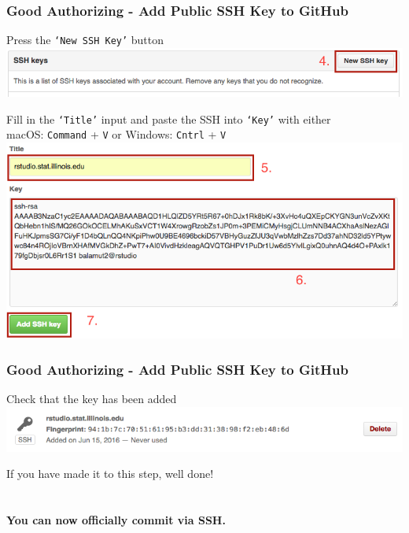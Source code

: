 \documentclass{beamer}\usepackage[]{graphicx}\usepackage[]{color}
\begin{document}
\begin{frame}[fragile]
\frametitle{Good Authorizing - Add Public SSH Key to GitHub}

\begin{block}{Press the \texttt{`New SSH Key'} button}
\centering
\includegraphics[scale=0.35]{img/ssh/github_new_ssh_key.png}
\end{block}

\begin{block}{Fill in the \texttt{`Title'} input and paste the SSH into \texttt{`Key'} with either \\ macOS: \texttt{Command} + \texttt{V} or Windows: \texttt{Cntrl} + \texttt{V}}
\centering
\includegraphics[scale=0.32]{img/ssh/github_ssh_key_add_example.png}
\end{block}

\end{frame}

\begin{frame}[fragile]
\frametitle{Good Authorizing - Add Public SSH Key to GitHub}

\begin{block}{Check that the key has been added}
\centering
\includegraphics[scale=0.45]{img/ssh/github_added_success.png}
\end{block}

If you have made it to this step, well done! 
\\$ $\\$ $\\
\centering
\Large
\textbf{You can now officially commit via SSH.}

\end{frame}
\end{document}
